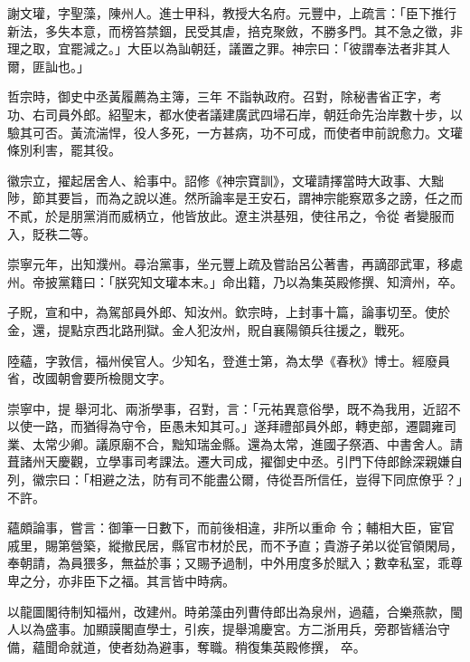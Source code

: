 \begin{pinyinscope}
 謝文瓘，字聖藻，陳州人。進士甲科，教授大名府。元豐中，上疏言：「臣下推行新法，多失本意，而榜笞禁錮，民受其虐，掊克聚斂，不勝多門。其不急之徵，非理之取，宜罷減之。」大臣以為訕朝廷，議置之罪。神宗曰：「彼謂奉法者非其人爾，匪訕也。」



 哲宗時，御史中丞黃履薦為主簿，三年
 不詣執政府。召對，除秘書省正字，考功、右司員外郎。紹聖末，都水使者議建廣武四埽石岸，朝廷命先治岸數十步，以驗其可否。黃流湍悍，役人多死，一方甚病，功不可成，而使者申前說愈力。文瓘條別利害，罷其役。



 徽宗立，擢起居舍人、給事中。詔修《神宗寶訓》，文瓘請擇當時大政事、大黜陟，節其要旨，而為之說以進。然所論率是王安石，謂神宗能察眾多之謗，任之而不貳，於是朋黨消而威柄立，他皆放此。遼主洪基殂，使往吊之，令從
 者變服而入，貶秩二等。



 崇寧元年，出知濮州。尋治黨事，坐元豐上疏及嘗詒呂公著書，再謫邵武軍，移處州。帝披黨籍曰：「朕究知文瓘本末。」命出籍，乃以為集英殿修撰、知濟州，卒。



 子貺，宣和中，為駕部員外郎、知汝州。欽宗時，上封事十篇，論事切至。使於金，還，提點京西北路刑獄。金人犯汝州，貺自襄陽領兵往援之，戰死。



 陸蘊，字敦信，福州侯官人。少知名，登進士第，為太學《春秋》博士。經廢員省，改國朝會要所檢閱文字。



 崇寧中，提
 舉河北、兩浙學事，召對，言：「元祐異意俗學，既不為我用，近詔不以使一路，而猶得為守令，臣愚未知其可。」遂拜禮部員外郎，轉吏部，遷闢雍司業、太常少卿。議原廟不合，黜知瑞金縣。還為太常，進國子祭酒、中書舍人。請葺諸州天慶觀，立學事司考課法。遷大司成，擢御史中丞。引門下侍郎餘深親嫌自列，徽宗曰：「相避之法，防有司不能盡公爾，侍從吾所信任，豈得下同庶僚乎？」不許。



 蘊頗論事，嘗言：御筆一日數下，而前後相違，非所以重命
 令；輔相大臣，宦官戚里，賜第營築，縱撤民居，縣官市材於民，而不予直；貴游子弟以從官領閑局，奉朝請，為員猥多，無益於事；又賜予過制，中外用度多於賦入；數幸私室，乖尊卑之分，亦非臣下之福。其言皆中時病。



 以龍圖閣待制知福州，改建州。時弟藻由列曹侍郎出為泉州，過蘊，合樂燕款，閩人以為盛事。加顯謨閣直學士，引疾，提舉鴻慶宮。方二浙用兵，旁郡皆繕治守備，蘊聞命就道，使者劾為避事，奪職。稍復集英殿修撰，
 卒。




\end{pinyinscope}
